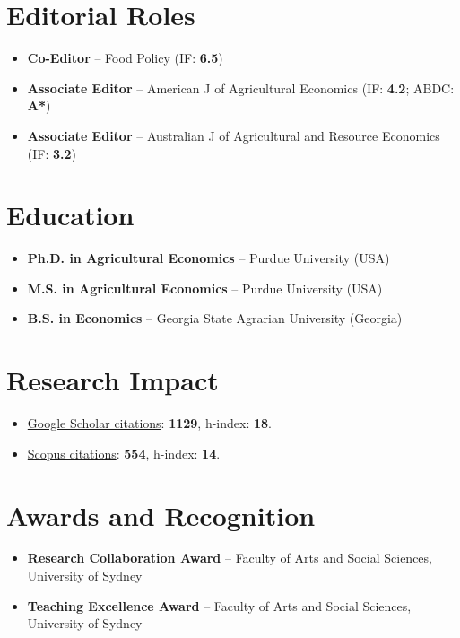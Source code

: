 \documentclass[10pt]{article}
\begin{document}
	\section*{Editorial Roles}
	\begin{itemize}
		\item {} \textbf{Co-Editor} -- Food Policy (IF: \textbf{6.5})
		\item {} \textbf{Associate Editor} -- American J of Agricultural Economics (IF: \textbf{4.2}; ABDC: \textbf{A*})
		\item {} \textbf{Associate Editor} -- Australian J of Agricultural and Resource Economics (IF: \textbf{3.2})
	\end{itemize}
	
	\section*{Education}
	\begin{itemize}
		\item {} \textbf{Ph.D. in Agricultural Economics} -- Purdue University (USA)
		\item {} \textbf{M.S. in Agricultural Economics} -- Purdue University (USA)
		\item {} \textbf{B.S. in Economics} -- Georgia State Agrarian University (Georgia)
	\end{itemize}
	
	\section*{Research Impact}
	\begin{itemize}
		\item \href{https://scholar.google.com/citations?user=VbNOr6wAAAAJ&hl=en}{Google Scholar citations}: \textbf{1129}, h-index: \textbf{18}.
		\item \href{https://www.scopus.com/authid/detail.uri?authorId=26421832000}{Scopus citations}: \textbf{554}, h-index: \textbf{14}.	
	\end{itemize}
	
	\section*{Awards and Recognition}
	\begin{itemize}
		\item {} \textbf{Research Collaboration Award} -- Faculty of Arts and Social Sciences, University of Sydney
		\item {} \textbf{Teaching Excellence Award} -- Faculty of Arts and Social Sciences, University of Sydney
	\end{itemize}
	
\end{document}
